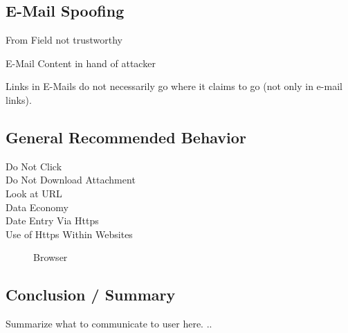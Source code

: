\subsection{E-Mail Spoofing}

\begin{description}
	\item{From Field} not trustworthy
	\item{E-Mail Content} in hand of attacker
	\item{Links in E-Mails} do not necessarily go where it claims to go (not only in e-mail links).
\end{description}

\subsection{General Recommended Behavior}
\begin{description}
	\item[Do Not Click]
	\item[Do Not Download Attachment]
	\item[Look at URL]
	\item[Data Economy]
	\item[Date Entry Via Https]
	\item[Use of Https Within Websites] Browser
\end{description}

\subsection{Conclusion / Summary}

Summarize what to communicate to user here.
..

